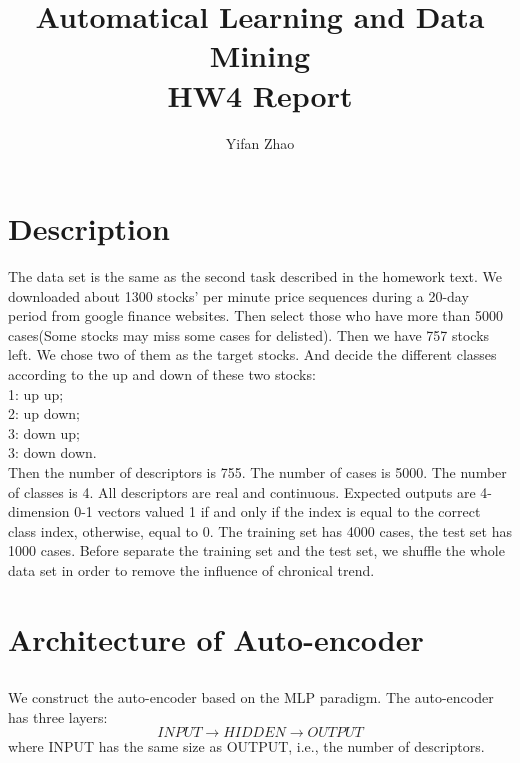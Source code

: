 \documentclass{article}
\author{Yifan Zhao}
\title{Automatical Learning and Data Mining\\HW4 Report}
\begin{document}
 \maketitle
 \section{Description}
 The data set is the same as the second task described in the homework text. We downloaded about 1300 stocks' per minute price sequences during a 20-day period from google finance websites. Then select those who have more than 5000 cases(Some stocks may miss some cases for delisted). Then we have 757 stocks left. We chose two of them as the target stocks. And decide the different classes according to the up and down of these two stocks:\\1: up up;\\2: up down;\\3: down up;\\3: down down.\\Then the number of descriptors is 755. The number of cases is 5000. The number of classes is 4. All descriptors are real and continuous. Expected outputs are 4-dimension 0-1 vectors valued 1 if and only if the index is equal to the correct class index, otherwise, equal to 0. The training set has 4000 cases, the test set has 1000 cases. Before separate the training set and the test set, we shuffle the whole data set in order to remove the influence of chronical trend.
 \section{Architecture of Auto-encoder}
 \subsection{}We construct the auto-encoder based on the MLP paradigm. The auto-encoder has three layers: \[INPUT\rightarrow HIDDEN\rightarrow OUTPUT\]
 where INPUT has the same size as OUTPUT, i.e., the number of descriptors.
\end{document}
